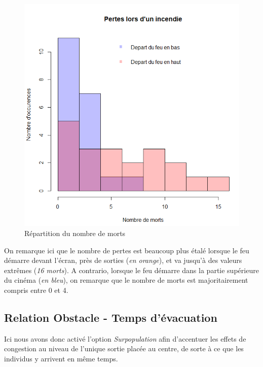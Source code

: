 \documentclass{article}
\begin{document}
\begin{figure}[H]
	\includegraphics[scale=0.35]{graphe_nb_mort.PNG}
  \centering
	\caption{Répartition du nombre de morts}
 	\label{pic: nb_morts}
\end{figure}

On remarque ici que le nombre de pertes est beaucoup plus étalé lorsque le feu démarre devant l'écran, près de sorties ({\it en orange}), et va jusqu'à des valeurs extrêmes ({\it 16 morts}).
A contrario, lorsque le feu démarre dans la partie supérieure du cinéma ({\it en bleu}), on remarque que le nombre de morts est majoritairement compris entre 0 et 4.

\subsection{Relation Obstacle - Temps d'évacuation}
Ici nous avons donc activé l'option {\it Surpopulation} afin d'accentuer les effets de congestion au niveau de l'unique sortie placée au centre, de sorte à ce que les individus y arrivent en même temps.
\end{document}
